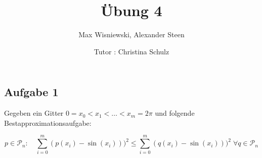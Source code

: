 \documentclass[11pt,a4paper,ngerman]{article}
\date{Tutor : Christina Schulz}
\title{Übung 4}
\author{Max Wisniewski, Alexander Steen}
\begin{document}

\renewcommand{\figurename}{Figure}

\maketitle
\thispagestyle{fancy}

\subsection*{Aufgabe 1}
Gegeben ein Gitter $0 = x_0 < x_1 < \ldots < x_m = 2 \pi$ und folgende Bestapproximationsaufgabe:

\begin{equation} \label{eq:1}
 p \in \mathcal{P}_n: \quad \sum_{i=0}^m {\left(p(x_i) - \sin(x_i) \right))^2} \leq \sum_{i=0}^m {\left(q(x_i) - \sin(x_i) \right))^2} \; \forall q \in \mathcal{P}_n
\end{equation}
\end{document}
